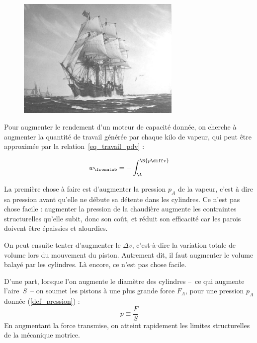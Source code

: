 	\begin{figure}
		\begin{center}
			\includegraphics[width=0.7\textwidth]{images/ss_savannah.jpg}
		\end{center}
	\end{figure}

	Pour augmenter le rendement d’un moteur de capacité donnée, on cherche à augmenter la quantité de travail générée par chaque kilo de vapeur, qui peut être approximée par la relation~\ref{eq_travail_pdv} :

	\begin{equation*}
	w_\fromatob = - \int _{\A}^\B {p \diff v}
	\end{equation*}

	La première chose à faire est d’augmenter la pression $p_A$ de la vapeur, c’est à dire sa pression avant qu’elle ne débute sa détente dans les cylindres. Ce n’est pas chose facile : augmenter la pression de la chaudière augmente les contraintes structurelles qu’elle subit, donc son coût, et réduit son efficacité car les parois doivent être épaissies et alourdies.

	On peut ensuite tenter d’augmenter le $\Delta v $, c’est-à-dire la variation totale de volume lors du mouvement du piston. Autrement dit, il faut augmenter le volume balayé par les cylindres. Là encore, ce n’est pas chose facile.
	
	D’une part, lorsque l’on augmente le diamètre des cylindres --\ ce qui augmente l’aire~$S$\ -- on soumet les pistons à une plus grande force $F_A$, pour une pression $p_A$ donnée (\ref{def_pression}) :
	\begin{equation*}
	p \equiv \frac{F}{S}
	\end{equation*}
	En augmentant la force transmise, on atteint rapidement les limites structurelles de la mécanique motrice.

